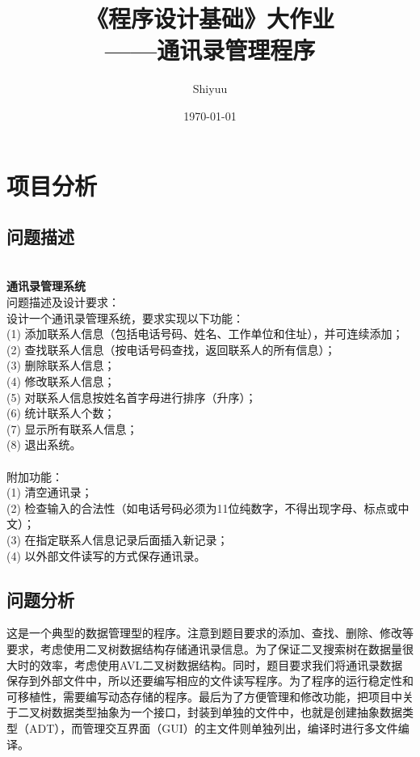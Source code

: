 \documentclass[12pt, a4paper, oneside]{ctexart}
\title{\textbf{《程序设计基础》大作业\\ ——通讯录管理程序}}
\author{Shiyuu}
\date{\today}
\newenvironment{problem*}
    {\begin{shaded}\par\noindent}{\end{shaded}\par}
\begin{document}
\maketitle

\section{项目分析}
\subsection{问题描述}
\begin{problem*}
    \\ \textbf{通讯录管理系统} \\
    问题描述及设计要求：\\
    设计一个通讯录管理系统，要求实现以下功能：\\
    (1) 添加联系人信息（包括电话号码、姓名、工作单位和住址），并可连续添加；\\
    (2) 查找联系人信息（按电话号码查找，返回联系人的所有信息）；\\
    (3) 删除联系人信息；\\
    (4) 修改联系人信息；\\
    (5) 对联系人信息按姓名首字母进行排序（升序）；\\
    (6) 统计联系人个数；\\
    (7) 显示所有联系人信息；\\
    (8) 退出系统。\\ \\
    附加功能：\\
    (1) 清空通讯录；\\
    (2) 检查输入的合法性（如电话号码必须为11位纯数字，不得出现字母、标点或中文）；\\
    (3) 在指定联系人信息记录后面插入新记录；\\
    (4) 以外部文件读写的方式保存通讯录。
\end{problem*}
\subsection{问题分析}
这是一个典型的数据管理型的程序。注意到题目要求的添加、查找、删除、修改等要求，考虑使用二叉树数据结构存储通讯录信息。为了保证二叉搜索树在数据量很大时的效率，考虑使用AVL二叉树数据结构。同时，题目要求我们将通讯录数据保存到外部文件中，所以还要编写相应的文件读写程序。为了程序的运行稳定性和可移植性，需要编写动态存储的程序。最后为了方便管理和修改功能，把项目中关于二叉树数据类型抽象为一个接口，封装到单独的文件中，也就是创建抽象数据类型（ADT），而管理交互界面（GUI）的主文件则单独列出，编译时进行多文件编译。
\end{document}
